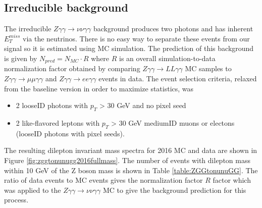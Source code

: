 


\subsection{Irreducible background}
The irreducible $Z \gamma \gamma \rightarrow \nu \nu \gamma \gamma$ background produces two photons and has inherent $E^{miss}_T$ via the neutrinos.  There is no easy way to separate these events from our signal so it is estimated using MC simulation.  The prediction of this background is given by $N_{pred} = N_{MC}\cdot R$ where $R$ is an overall simulation-to-data normalization factor obtained by comparing $Z \gamma \gamma \rightarrow LL \gamma \gamma$ MC samples to $Z\gamma \gamma \rightarrow \mu \mu \gamma \gamma$ and $Z\gamma \gamma \rightarrow ee \gamma \gamma$ events in data.  The event selection criteria, relaxed from the baseline version in order to maximize statistics, was
\begin{itemize}
	\item 2 looseID photons with $p_T$ > 30 GeV and no pixel seed
	\item 2 like-flavored leptons with $p_T$ > 30 GeV %
	 mediumID muons or
	 electons (looseID photons with pixel seeds).
\end{itemize}
The resulting dilepton invariant mass spectra for 2016 MC and data are shown in Figure \ref{fig:zggtonunugg2016fullmass}.  The number of events with dilepton mass within 10 GeV of the Z boson mass is shown in Table \ref{table:ZGGtonunuGG}.  The ratio of data events to MC events gives the normalization factor $R$ factor which was applied to the $Z \gamma \gamma \rightarrow \nu \nu \gamma \gamma$ MC to give the background prediction for this process.


